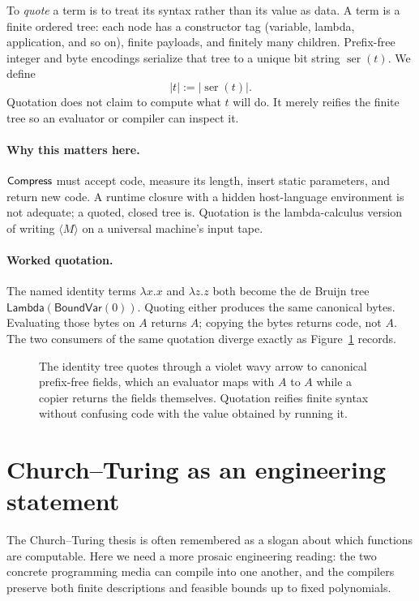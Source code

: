 To \emph{quote} a term is to treat its syntax rather than its value as data.
A term is a finite ordered tree: each node has a constructor tag
(variable, lambda, application, and so on), finite payloads, and finitely many
children.  Prefix-free integer and byte encodings serialize that tree to a
unique bit string \(\operatorname{ser}(t)\).  We define
\[
 |t|:=|\operatorname{ser}(t)|.
\]
Quotation does not claim to compute what \(t\) will do.  It merely reifies the
finite tree so an evaluator or compiler can inspect it.

\paragraph{Why this matters here.}
\(\mathsf{Compress}\) must accept code, measure its length, insert static parameters,
and return new code.  A runtime closure with a hidden host-language
environment is not adequate; a quoted, closed tree is.  Quotation is the
lambda-calculus version of writing \(\langle M\rangle\) on a universal
machine's input tape.

\paragraph{Worked quotation.}
The named identity terms \(\lambda x.x\) and \(\lambda z.z\) both become the
de Bruijn tree \(\mathsf{Lambda}(\mathsf{BoundVar}(0))\).  Quoting either
produces the same canonical bytes.  Evaluating those bytes on \(A\) returns
\(A\); copying the bytes returns code, not \(A\).
The two consumers of the same quotation diverge exactly as
Figure~\ref{fig:quotation} records.

\begin{figure}[t]
\centering

\caption{The identity tree quotes through a violet wavy arrow to canonical prefix-free fields, which an evaluator maps with $A$ to $A$ while a copier returns the fields themselves.  Quotation reifies finite syntax without confusing code with the value obtained by running it.}
\label{fig:quotation}
\end{figure}

\section{Church--Turing as an engineering statement}
\label{sec:refresher-engineering}

The Church--Turing thesis is often remembered as a slogan about which
functions are computable.  Here we need a more prosaic engineering reading:
the two concrete programming media can compile into one another, and the
compilers preserve both finite descriptions and feasible bounds up to fixed
polynomials.

